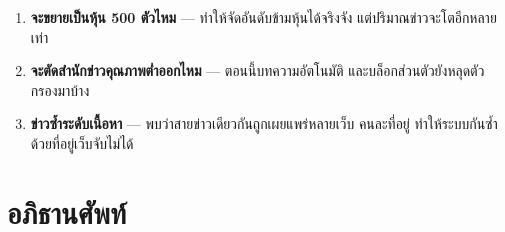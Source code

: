 \documentclass[11pt]{article}
\begin{document}
\begin{enumerate}
\item \textbf{จะขยายเป็นหุ้น 500 ตัวไหม} --- ทำให้จัดอันดับข้ามหุ้นได้จริงจัง
      แต่ปริมาณข่าวจะโตอีกหลายเท่า
\item \textbf{จะตัดสำนักข่าวคุณภาพต่ำออกไหม} --- ตอนนี้บทความอัตโนมัติ
      และบล็อกส่วนตัวยังหลุดตัวกรองมาบ้าง
\item \textbf{ข่าวซ้ำระดับเนื้อหา} --- พบว่าสายข่าวเดียวกันถูกเผยแพร่หลายเว็บ
      คนละที่อยู่ ทำให้ระบบกันซ้ำด้วยที่อยู่เว็บจับไม่ได้
\end{enumerate}

\section{อภิธานศัพท์}
\end{document}
